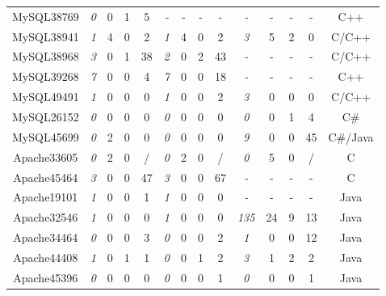 \begin{table*}[tb!]
\begin{adjustwidth}{-.75in}{-.75in}
{\begin{tabular}{cccccccccccccc}
MySQL38769     & {\it  0}     & 0      & 1      & 5      & {\it - }     & -      & -      & -      & {\it -  }    & -      & -      & -      & C++	\\ 
MySQL38941     & {\it  1}     & 4      & 0      & 2      & {\it 1 }     & 4      & 0      & 2      & {\it 3  }    & 5      & 2      & 0      & C/C++	\\
MySQL38968     & {\it  3}     & 0      & 1      & 38     & {\it 2 }     & 0      & 2      & 43     & {\it -  }    & -      & -      & -      & C/C++	\\
MySQL39268     & {\it 7 }     & 0      & 0      & 4      & {\it 7 }     & 0      & 0      & 18     & {\it -  }    & -      & -      & -      & C++	\\ 
MySQL49491     & {\it 1 }     & 0      & 0      & 0      & {\it 1 }     & 0      & 0      & 2      & {\it 3  }    & 0      & 0      & 0      & C/C++	\\
MySQL26152     & {\it  0}     & 0      & 0      & 0      & {\it 0 }     & 0      & 0      & 0      & {\it 0  }    & 0      & 1      & 4      & C\#	\\ 
MySQL45699     & {\it  0}     & 2      & 0      & 0      & {\it 0 }     & 0      & 0      & 0      & {\it 9  }    & 0      & 0      & 45     & C\#/Java	\\
\midrule
Apache33605    & {\it  0}     & 2      & 0      & /      & {\it 0 }     & 2      & 0      & /      & {\it 0  }    & 5      & 0      & /      & C  	\\
Apache45464    & {\it  3}     & 0      & 0      & 47     & {\it 3 }     & 0      & 0      & 67     & {\it -  }    & -      & -      & -      & C	\\ 
Apache19101    & {\it  1}     & 0      & 0      & 1      & {\it 1 }     & 0      & 0      & 0      & {\it -  }    & -      & -      & -      & Java	\\
Apache32546    & {\it  1}     & 0      & 0      & 0      & {\it 1 }     & 0      & 0      & 0      & {\it 135}    & 24     & 9      & 13     & Java	\\
Apache34464    & {\it  0}     & 0      & 0      & 3      & {\it 0 }     & 0      & 0      & 2      & {\it 1  }    & 0      & 0      & 12     & Java	\\
Apache44408    & {\it  1}     & 0      & 1      & 1      & {\it 0 }     & 0      & 1      & 2      & {\it 3  }    & 1      & 2      & 2      & Java	\\
Apache45396    & {\it  0}     & 0      & 0      & 0      & {\it 0 }     & 0      & 0      & 1      & {\it 0  }    & 0      & 0      & 1      & Java	\\

\end{tabular}}
\end{adjustwidth}
\end{table*}
